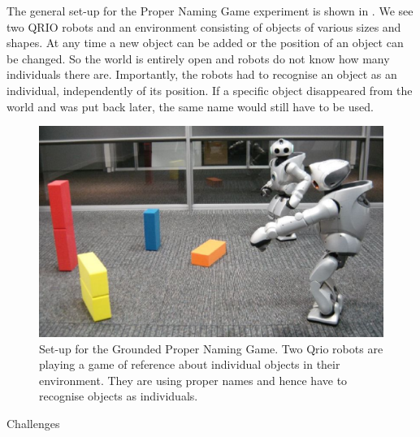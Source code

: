 The general set-up for the Proper Naming Game experiment
is shown in . We see two QRIO robots and an environment consisting of objects of various 
sizes and shapes. At any time a new object can be added or the position of an object can be changed. So the world is 
entirely open and robots do not know how many individuals there are. 
Importantly, the robots had to recognise an object as an individual, independently of its position. If 
a specific object disappeared from the world and was put back later, the same name would still have to be used. \\ 
\begin{figure}[htbp]
  \centerline{\includegraphics[width=.80\textwidth]{chap11/figs/grounded-naming-game}}
\caption{\label{fig:grounded} 
Set-up for the Grounded Proper Naming Game. Two Qrio robots are playing a game of reference about individual objects 
in their environment. They are using proper names and hence have to recognise objects as individuals.}
\end{figure}

{\bfshape Challenges} \\


